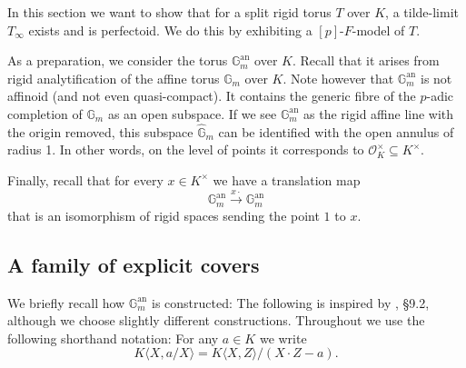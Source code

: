 \documentclass[10pt,oneside]{amsart}
\theoremstyle{definition}
\theoremstyle{remark}
\begin{document}
	In this section we want to show that for a split rigid torus $T$ over $K$, a tilde-limit $T_\infty$ exists and is perfectoid. We do this by exhibiting a $[p]$-$F$-model of $T$.
	
	As a preparation, we consider the torus $\mathbb G_m^{\operatorname{an}}$ over $K$. Recall that it arises from rigid analytification of the affine torus $\mathbb G_m$ over $K$. Note however that $\mathbb G_m^{\operatorname{an}}$ is not affinoid (and not even quasi-compact). It contains the generic fibre of the $p$-adic completion of $\mathbb G_m$ as an open subspace. If we see $\mathbb G_m^{\operatorname{an}}$ as the rigid affine line with the origin removed, this subspace $\widehat{\mathbb G}_m$ can be identified with the open annulus of radius 1. In other words, on the level of points it corresponds to $\mathcal O_K^\times \subseteq K^\times$.
	
	Finally, recall that for every $x\in K^\times$ we have a translation map
	\[\mathbb G_m^{\operatorname{an}}\xrightarrow{x\cdot} \mathbb G_m^{\operatorname{an}}\]
	that is an isomorphism of rigid spaces sending the point $1$ to $x$.
	
	\subsection{A family of explicit covers}
	We briefly recall how $\mathbb G_m^{\operatorname{an}}$ is constructed: The following is inspired by \cite{Bosch lectures}, \S 9.2, although we choose slightly different constructions. Throughout we use the following shorthand notation: For any $a\in K$ we write
	\[K\langle X,a/X\rangle = K\langle X,Z\rangle/(X\cdot Z - a). \]
	
\end{document}
